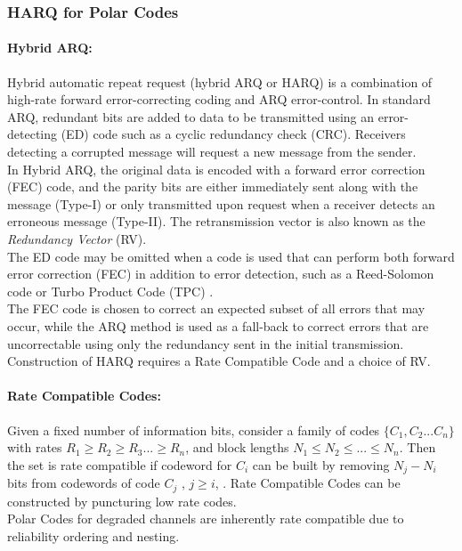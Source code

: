 \documentclass[
11pt, %
a4paper, %
oneside, %
headinclude,footinclude, %
BCOR5mm, %
]{scrartcl}
\begin{document}
\subsubsection{HARQ for Polar Codes}
\paragraph{Hybrid ARQ:}Hybrid automatic repeat request (hybrid ARQ or HARQ) is a combination of high-rate forward error-correcting coding and ARQ error-control. In standard ARQ, redundant bits are added to data to be transmitted using an error-detecting (ED) code such as a cyclic redundancy check (CRC). Receivers detecting a corrupted message will request a new message from the sender. \\In Hybrid ARQ, the original data is encoded with a forward error correction (FEC) code, and the parity bits are either immediately sent along with the message (Type-I) or only transmitted upon request when a receiver detects an erroneous message (Type-II). The retransmission vector is also known as the \emph{Redundancy Vector} (RV). \\The ED code may be omitted when a code is used that can perform both forward error correction (FEC) in addition to error detection, such as a Reed-Solomon code or  Turbo Product Code (TPC) \cite{harqmukhtar}.\\The FEC code is chosen to correct an expected subset of all errors that may occur, while the ARQ method is used as a fall-back to correct errors that are uncorrectable using only the redundancy sent in the initial transmission.\\Construction of HARQ requires a Rate Compatible Code and a choice of RV.
\paragraph{Rate Compatible Codes:}
Given a fixed number of information bits, consider a family of codes $\{C_1,C_2...C_n\}$  with rates $R_1\geq R_2\geq R_3...\geq R_n$, and block lengths $N_1 \leq N_2 \leq ... \leq N_n$.
Then the set is rate compatible if codeword for $C_i$ can be built by removing $N_j-N_i$ bits from codewords of code $C_j$ , $j\geq i$, \cite{mondelli}. Rate Compatible Codes can be constructed by puncturing low rate codes. 
\\Polar Codes for degraded channels are inherently rate compatible due to reliability ordering and nesting.
\end{document}
